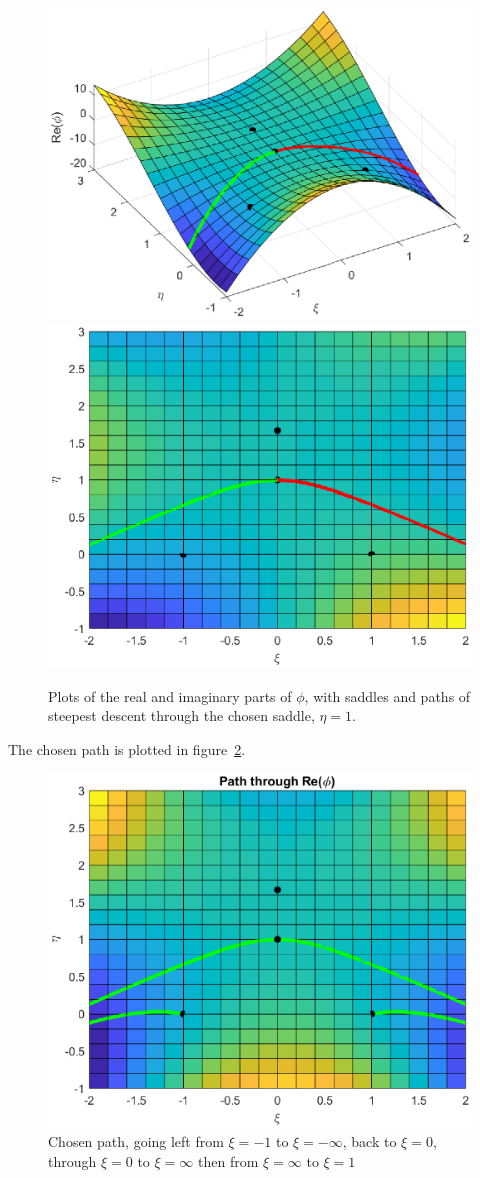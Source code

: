 \documentclass{X:/Documents/Coding/Latex/myassignment}
\begin{document}
\begin{enumerate}
		\begin{figure}[h]
			\centering
			\includegraphics[width=0.8\linewidth]{TopicCA5Q2real.eps}
			\includegraphics[width=0.8\linewidth]{TopicCA5Q2imag.eps}
			\caption{Plots of the real and imaginary parts of $\phi$, with saddles and paths of steepest descent through the chosen saddle, $\eta=1$.}
			\label{fig:q2}
		\end{figure}


	The chosen path is plotted in figure~\ref{fig:q2path}. 
	\begin{figure}[tb]
		\centering
		\includegraphics[width=0.8\linewidth]{TopicCA5Q2path.eps}
		\caption{Chosen path, going left from $\xi=-1$ to $\xi=-\infty$, back to $\xi=0$, through $\xi=0$ to $\xi =\infty$ then from $\xi=\infty$ to $\xi=1$}
		\label{fig:q2path}
	\end{figure}


\end{enumerate}
\end{document}
